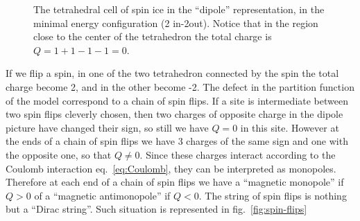 \documentclass[../main/main.tex]{subfiles}
\begin{document}
\begin{figure}[h]

\caption{The tetrahedral cell of spin ice in the ``dipole'' representation, in the minimal energy configuration (2 in-2out). Notice that in the region close to the center of the tetrahedron the total charge is $Q=1+1-1-1=0$.}
\label{fig:spin-ice-dipole}
\end{figure}

If we flip a spin, in one of the two tetrahedron connected by the spin the total charge become 2, and in the other become -2. The defect in the partition function of the model correspond to a chain of spin flips. If a site is intermediate between two spin flips cleverly chosen, then two charges of opposite charge in the dipole picture have changed their sign, so still we have $Q=0$ in this site. However at the ends of a chain of spin flips we have 3 charges of the same sign and one with the opposite one, so that $Q\neq0$. Since these charges interact according to the Coulomb interaction eq.~\eqref{eq:Coulomb}, they can be interpreted as monopoles. Therefore at each end of a chain of spin flips we have a ``magnetic monopole'' if $Q>0$ of a ``magnetic antimonopole'' if $Q<0$. The string of spin flips is nothing but a ``Dirac string''. Such situation is represented in fig.~\ref{fig:spin-flips}
\end{document}
